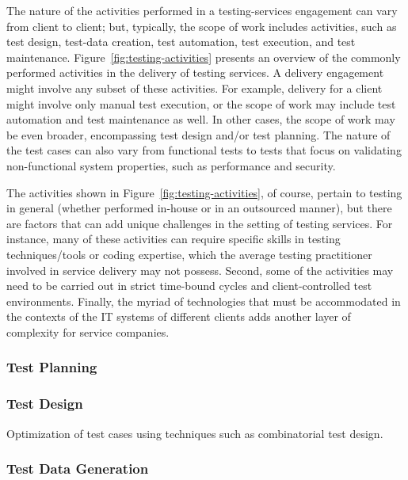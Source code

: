 The nature of the activities performed in a testing-services engagement can vary
from client to client; but, typically, the scope of work includes activities,
such as test design, test-data creation, test automation, test execution, and
test maintenance. Figure~\ref{fig:testing-activities} presents an overview of
the commonly performed activities in the delivery of testing services. A
delivery engagement might involve any subset of these activities. For example,
delivery for a client might involve only manual test execution, or the scope of
work may include test automation and test maintenance as well. In other cases,
the scope of work may be even broader, encompassing test design and/or test
planning. The nature of the test cases can also vary from functional tests to
tests that focus on validating non-functional system properties, such as
performance and security.

The activities shown in Figure~\ref{fig:testing-activities}, of course, pertain
to testing in general (whether performed in-house or in an outsourced manner),
but there are factors that can add unique challenges in the setting of testing
services. For instance, many of these activities can require specific skills in
testing techniques/tools or coding expertise, which the average testing
practitioner involved in service delivery may not possess. Second, some of the
activities may need to be carried out in strict time-bound cycles and
client-controlled test environments. Finally, the myriad of technologies that
must be accommodated in the contexts of the IT systems of different clients adds
another layer of complexity for service companies.

\subsubsection{Test Planning}
\label{sec:test-planning}

\subsubsection{Test Design}
\label{sec:test-design}

Optimization of test cases using techniques such as combinatorial test design.

\subsubsection{Test Data Generation}
\label{sec:test-data}

